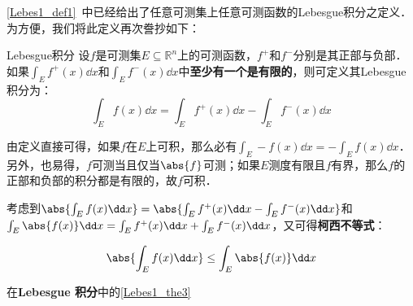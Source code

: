 

\autoref{Lebes1_def1}~中已经给出了任意可测集上任意可测函数的Lebesgue积分之定义．为方便，我们将此定义再次誊抄如下：

\begin{definition}{Lebesgue积分}
设$f$是可测集$E\subseteq\mathbb{R}^n$上的可测函数，$f^+$和$f^-$分别是其正部与负部．如果$\int_E f^+(x) \dd x$和$\int_E f^-(x) \dd x$中\textbf{至少有一个是有限的}，则可定义其Lebesgue积分为：
\begin{equation}
\int_E f(x) \dd x = \int_E f^+(x) \dd x - \int_E f^-(x) \dd x
\end{equation}
\end{definition}

由定义直接可得，如果$f$在$E$上可积，那么必有$\int_E -f(x) \dd x = -\int_E f(x) \dd x$．另外，也易得，$f$可测当且仅当$\abs{f}$可测；如果$E$测度有限且$f$有界，那么$f$的正部和负部的积分都是有限的，故$f$可积．

考虑到$\abs{\int_E f(x) \dd x}=\abs{\int_E f^+(x) \dd x - \int_E f^-(x) \dd x}$和$\int_E \abs{f(x)} \dd x = \int_E f^+(x) \dd x + \int_E f^-(x) \dd x$，又可得\textbf{柯西不等式}：

\begin{equation}
\abs{\int_E f(x) \dd x} \leq \int_E \abs{f(x)} \dd x
\end{equation}

在\textbf{Lebesgue 积分}中的\autoref{Lebes1_the3}~
















